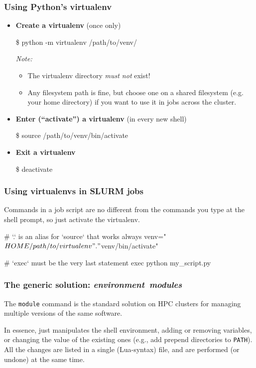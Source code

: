 \documentclass[english,serif,mathserif,usenames,dvipsnames]{beamer}
\begin{document}
\begin{frame}
  \frametitle{Using Python's virtualenv}
  \small

  \begin{itemize}
  \item \textbf{Create a virtualenv} (once only)

\begin{semiverbatim}
\$ python -m virtualenv /path/to/venv/
\end{semiverbatim}

    \emph{Note:}
    \begin{itemize}
    \item The virtualenv directory \emph{must not} exist!
    \item Any filesystem path is fine, but choose one on a shared
      filesystem (e.g. your home directory) if you want to use it in
      jobs across the cluster.
    \end{itemize}

  \item \textbf{Enter (``activate'') a virtualenv} (in every new shell)

\begin{semiverbatim}
\$ source /path/to/venv/bin/activate
\end{semiverbatim}

  \item \textbf{Exit a virtualenv}

\begin{semiverbatim}
\$ deactivate
\end{semiverbatim}

  \end{itemize}
\end{frame}


\begin{frame}[fragile]
  \frametitle{Using virtualenvs in SLURM jobs}

  Commands in a job script are no different from the commands you type at the shell prompt, so just activate the virtualenv.
  \begin{sh}
# `.` is an alias for `source` that works always
venv="$HOME/path/to/virtualenv"
. "$venv/bin/activate"

# `exec` must be the very last statement
exec python my_script.py
  \end{sh}
\end{frame}


\begin{frame}
  \frametitle{The generic solution: \em environment~modules}

  The \texttt{module} command is the standard solution on HPC clusters
  for managing multiple versions of the same software.

  \+ In essence, just manipulates the shell environment, adding or
  removing variables, or changing the value of the existing ones
  (e.g., add prepend directories to \texttt{PATH}).  All the changes
  are listed in a single (Lua-syntax) file, and are performed (or
  undone) at the same time.
\end{frame}
\end{document}
